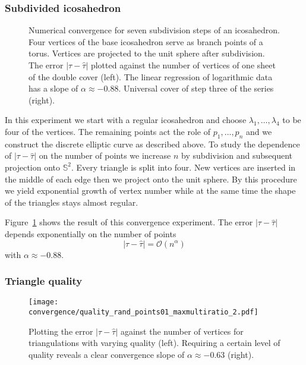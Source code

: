 \documentclass[Thesis.tex]{subfiles}
\begin{document}
  \subsubsection{Subdivided icosahedron}

  \begin{figure}
  \caption{Numerical convergence for seven subdivision steps of an icosahedron.
  Four vertices of the base icosahedron serve as branch points of a torus.
  Vertices are projected to the unit sphere after subdivision.
  The error $|\tau - \hat\tau|$ plotted against the number of vertices of one sheet of the double cover (left).
  The linear regression of logarithmic data has a slope of $\alpha\approx-0.88$.
  Universal cover of step three of the series (right).
  }
  \label{fig:convergence_subdivision}
  \end{figure}

  In this experiment we start with a regular icosahedron and choose $\lambda_1,\ldots,\lambda_4$ to be four of the vertices. The remaining points act the role of $p_1,\ldots,p_n$ and we construct the discrete elliptic curve as described above. To study the dependence of $|\tau-\hat \tau|$ on the number of points we increase $n$ by subdivision and subsequent projection onto $\mathbb S^2$. Every triangle is split into four. New vertices are inserted in the middle of each edge then we project onto the unit sphere. By this procedure we yield exponential growth of vertex number while at the same time the shape of the triangles stays almost regular.

  Figure~\ref{fig:convergence_subdivision} shows the result of this convergence experiment. The error $|\tau-\hat \tau|$ depends exponentially on the number of points
  \[|\tau-\hat \tau|=\mathcal O (n^\alpha)\]
  with $\alpha \approx -0.88$.

  \subsubsection{Triangle quality}

  \begin{figure}
  \texttt{[image: convergence/quality\_rand\_points01\_maxmultiratio\_2.pdf]}
  \caption{Plotting the error $|\tau - \hat\tau|$ against the number of vertices for triangulations with varying quality (left). Requiring a certain level of quality reveals a clear convergence slope of $\alpha\approx -0.63$ (right).}
  \label{fig:convergence_quality}
  \end{figure}
\end{document}
